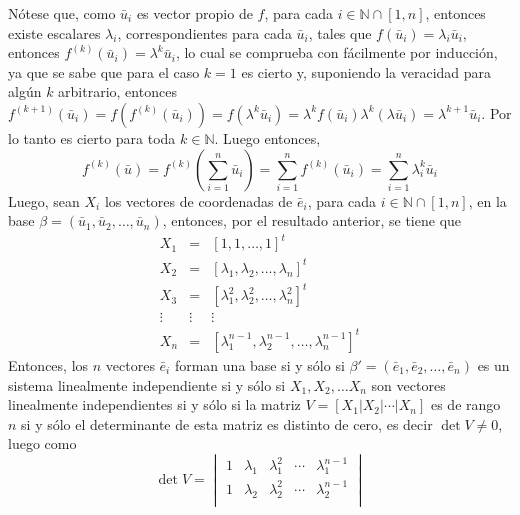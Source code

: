 \begin{solucion}
 N\'otese que, como $\bar{u}_i$ es vector propio de $f$, para cada $i \in \mathbb{N}\cap[1,n]$, entonces existe escalares $\lambda_i$, correspondientes para cada $\bar{u}_i$, tales que $f\left( \bar{u}_i \right) = \lambda_i \bar{u}_i$, entonces $f^{(k)}\left(\bar{u}_i \right) = \lambda^k \bar{u}_i$, lo cual se comprueba con f\'acilmente por inducci\'on, ya que se sabe que para el caso $k=1$ es cierto y, suponiendo la veracidad para alg\'un $k$ arbitrario, entonces $f^{(k+1)}\left( \bar{u}_i \right) = f\left( f^{(k)}\left( \bar{u}_i \right) \right) = f\left( \lambda^{k}\bar{u}_i \right) = \lambda^{k}f\left( \bar{u}_i \right) \lambda^{k}\left( \lambda \bar{u}_i \right) = \lambda^{k+1}\bar{u}_i$. Por lo tanto es cierto para toda $k \in \mathbb{N}$. Luego entonces, 
 \begin{equation*}
  f^{(k)}\left( \bar{u} \right) = f^{(k)}\left( \sum_{i=1}^n \bar{u}_i \right) = \sum_{i=1}^n f^{(k)}\left( \bar{u}_i \right) = \sum_{i=1}^n \lambda_i^{k}\bar{u}_i
 \end{equation*}
 Luego, sean $X_i$ los vectores de coordenadas de $\bar{e}_i$, para cada $i\in \mathbb{N}\cap[1,n]$, en la base $\beta = \left( \bar{u}_1, \bar{u}_2, \ldots, \bar{u}_n \right)$, entonces, por el resultado anterior, se tiene que
 \begin{eqnarray*}
  X_1 & = & [1, 1, \ldots, 1]^t \\
  X_2 & = & [\lambda_1, \lambda_2, \ldots, \lambda_n]^t \\
  X_3 & = & [\lambda_1^2, \lambda_2^2, \ldots, \lambda_n^2]^t \\
  \vdots & \vdots & \vdots \\
  X_n & = & [\lambda_1^{n-1}, \lambda_2^{n-1}, \ldots, \lambda_n^{n-1}]^t
 \end{eqnarray*}
 Entonces, los $n$ vectores $\bar{e}_i$ forman una base si y s\'olo si $\beta' = \left( \bar{e}_1, \bar{e}_2, \ldots, \bar{e}_n \right)$ es un sistema linealmente independiente si y s\'olo si $X_1, X_2, \ldots X_n$ son vectores linealmente independientes si y s\'olo si la matriz $V = [X_1|X_2|\cdots |X_n]$ es de rango $n$ si y s\'olo el determinante de esta matriz es distinto de cero, es decir $\det V \neq 0$, luego como
 \begin{equation*}
  \det V = 
  \begin{vmatrix}
   1 & \lambda_1 & \lambda_1^2 & \cdots & \lambda_1^{n-1} \\
   1 & \lambda_2 & \lambda_2^2 & \cdots & \lambda_2^{n-1} \\

\end{vmatrix}
\end{equation*}
\end{solucion}
